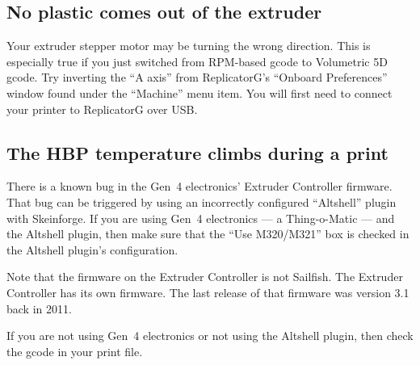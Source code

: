 \subsection{No plastic comes out of the extruder}

Your extruder stepper motor may be turning the wrong direction.  This
is especially true if you just switched from RPM-based gcode to Volumetric
5D gcode.  Try inverting the ``A axis'' from ReplicatorG's ``Onboard
Preferences'' window found under the ``Machine'' menu item.  You will
first need to connect your printer to ReplicatorG over USB.

\subsection{The HBP temperature climbs during a print}

There is a known bug in the Gen~4 electronics' Extruder Controller firmware.
That bug can be triggered by using an incorrectly configured
``Altshell'' plugin with Skeinforge.  If you are using Gen~4 electronics --- a
Thing-o-Matic --- and the Altshell plugin, then make sure that the
``Use M320/M321'' box is checked in the Altshell plugin's configuration.

Note that the firmware on the Extruder Controller is not Sailfish.  The
Extruder Controller has its own firmware.  The last release of that firmware
was version 3.1 back in 2011.

If you are not using Gen~4 electronics or not using the Altshell plugin,
then check the gcode in your print file.

